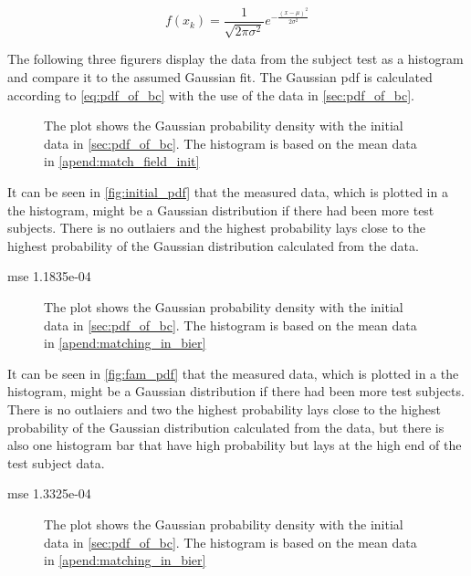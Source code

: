 \begin{equation}\label{eq:pdf_of_bc}
f(x_{k}) = \frac{1}{\sqrt{2 \pi \sigma^2}}e^{-\frac{(x-\mu)^2}{2\sigma^2}}
\end{equation}


The following three figurers display the data from the subject test as a histogram and compare it to the assumed Gaussian fit. The Gaussian \gls{pdf} is calculated according to \autoref{eq:pdf_of_bc} with the use of the data in \autoref{sec:pdf_of_bc}.



 \begin{figure}[H]
	\centering
	
		\caption{The plot shows the Gaussian probability density with the initial data in \autoref{sec:pdf_of_bc}. The histogram is based on the mean data in \autoref{apend:match_field_init}}
		\label{fig:initial_pdf}
\end{figure}

It can be seen in \autoref{fig:initial_pdf} that the measured data, which is plotted in a the histogram, might be a Gaussian distribution if there had been more test subjects. There is no outlaiers and the highest probability lays close to the highest probability of the Gaussian distribution calculated from the data.

mse 1.1835e-04

 \begin{figure}[H]
	\centering
	
		\caption{The plot shows the Gaussian probability density with the initial data in \autoref{sec:pdf_of_bc}. The histogram is based on the mean data in \autoref{apend:matching_in_bier}}
		\label{fig:fam_pdf}
\end{figure}

It can be seen in \autoref{fig:fam_pdf} that the measured data, which is plotted in a the histogram, might be a Gaussian distribution if there had been more test subjects. There is no outlaiers and two the highest probability lays close to the highest probability of the Gaussian distribution calculated from the data, but there is also one histogram bar that have high probability but lays at the high end of the test subject data. 

mse 1.3325e-04

 \begin{figure}[H]
	\centering
	
		\caption{The plot shows the Gaussian probability density with the initial data in \autoref{sec:pdf_of_bc}. The histogram is based on the mean data in \autoref{apend:matching_in_bier}}
		\label{fig:bier_pdf}
\end{figure}

